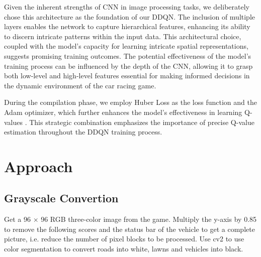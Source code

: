 \documentclass{article}
\begin{document}
Given the inherent strengths of CNN in image processing tasks, we deliberately chose this architecture as the foundation of our DDQN. The inclusion of multiple layers enables the network to capture hierarchical features, enhancing its ability to discern intricate patterns within the input data. This architectural choice, coupled with the model's capacity for learning intricate spatial representations, suggests promising training outcomes. The potential effectiveness of the model's training process can be influenced by the depth of the CNN, allowing it to grasp both low-level and high-level features essential for making informed decisions in the dynamic environment of the car racing game.

During the compilation phase, we employ Huber Loss as the loss function and the Adam optimizer, which further enhances the model's effectiveness in learning Q-values . This strategic combination emphasizes the importance of precise Q-value estimation throughout the DDQN training process.




\section{Approach}
\label{others}

\subsection{Grayscale Convertion}
Get a 96 $\times$ 96 RGB three-color image from the game. Multiply the y-axis by 0.85
to remove the following scores and the status bar of the vehicle to get a complete picture, 
i.e. reduce the number of pixel blocks to be processed. 
Use cv2 to use color segmentation to convert roads into white, lawns and vehicles into black.
\end{document}
